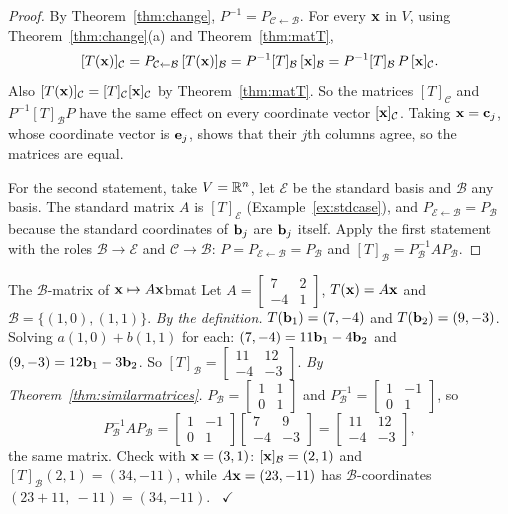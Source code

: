 \documentclass[11pt]{article}
\begin{document}
\begin{proof}
By Theorem~\ref{thm:change}, $P^{-1}=P_{\mathcal{C}\leftarrow\mathcal{B}}$. For every $\mathbf{x}$ in $V$, using Theorem~\ref{thm:change}(a) and Theorem~\ref{thm:matT},
\[
[T(\mathbf{x})]_{\mathcal{C}}=P_{\mathcal{C}\leftarrow\mathcal{B}}\,[T(\mathbf{x})]_{\mathcal{B}}=P^{-1}[T]_{\mathcal{B}}\,[\mathbf{x}]_{\mathcal{B}}=P^{-1}[T]_{\mathcal{B}}\,P\,[\mathbf{x}]_{\mathcal{C}}.
\]
Also $[T(\mathbf{x})]_{\mathcal{C}}=[T]_{\mathcal{C}}[\mathbf{x}]_{\mathcal{C}}$ by Theorem~\ref{thm:matT}. So the matrices $[T]_{\mathcal{C}}$ and $P^{-1}[T]_{\mathcal{B}}P$ have the same effect on every coordinate vector $[\mathbf{x}]_{\mathcal{C}}$. Taking $\mathbf{x}=\mathbf{c}_j$, whose coordinate vector is $\mathbf{e}_j$, shows that their $j$th columns agree, so the matrices are equal.

For the second statement, take $V=\mathbb{R}^n$, let $\mathcal{E}$ be the standard basis and $\mathcal{B}$ any basis. The standard matrix $A$ is $[T]_{\mathcal{E}}$ (Example~\ref{ex:stdcase}), and $P_{\mathcal{E}\leftarrow\mathcal{B}}=P_{\mathcal{B}}$ because the standard coordinates of $\mathbf{b}_j$ are $\mathbf{b}_j$ itself. Apply the first statement with the roles $\mathcal{B}\to\mathcal{E}$ and $\mathcal{C}\to\mathcal{B}$: $P=P_{\mathcal{E}\leftarrow\mathcal{B}}=P_{\mathcal{B}}$ and $[T]_{\mathcal{B}}=P_{\mathcal{B}}^{-1}AP_{\mathcal{B}}$.
\end{proof}

\begin{exmp}{The $\mathcal{B}$-matrix of $\mathbf{x}\mapsto A\mathbf{x}$}{bmat}
Let $A=\begin{bmatrix}7&2\\-4&1\end{bmatrix}$, $T(\mathbf{x})=A\mathbf{x}$ and $\mathcal{B}=\{(1,0),(1,1)\}$. \emph{By the definition.} $T(\mathbf{b}_1)=(7,-4)$ and $T(\mathbf{b}_2)=(9,-3)$. Solving $a(1,0)+b(1,1)$ for each: $(7,-4)=11\mathbf{b}_1-4\mathbf{b}_2$ and $(9,-3)=12\mathbf{b}_1-3\mathbf{b}_2$. So $[T]_{\mathcal{B}}=\begin{bmatrix}11&12\\-4&-3\end{bmatrix}$. \emph{By Theorem~\ref{thm:similarmatrices}.} $P_{\mathcal{B}}=\begin{bmatrix}1&1\\0&1\end{bmatrix}$ and $P_{\mathcal{B}}^{-1}=\begin{bmatrix}1&-1\\0&1\end{bmatrix}$, so
\[
P_{\mathcal{B}}^{-1}AP_{\mathcal{B}}=\begin{bmatrix}1&-1\\0&1\end{bmatrix}\begin{bmatrix}7&9\\-4&-3\end{bmatrix}=\begin{bmatrix}11&12\\-4&-3\end{bmatrix},
\]
the same matrix. Check with $\mathbf{x}=(3,1)$: $[\mathbf{x}]_{\mathcal{B}}=(2,1)$ and $[T]_{\mathcal{B}}(2,1)=(34,-11)$, while $A\mathbf{x}=(23,-11)$ has $\mathcal{B}$-coordinates $(23+11,\ -11)=(34,-11)$. \ $\checkmark$
\end{exmp}
\end{document}
